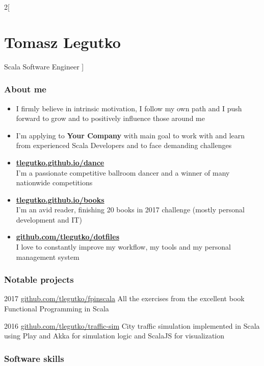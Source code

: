 \documentclass{tccv}
\begin{document}
\begin{multicols}{2}[
\part{Tomasz Legutko}{Scala Software Engineer}
]
\section{About me}
\begin{itemize}[noitemsep,topsep=0pt]
\item I firmly believe in intrinsic motivation, I follow my own path and I push forward to grow and to positively influence those around me
\item I'm applying to {\bfseries Your Company} with main goal to work with and learn from experienced Scala Developers and to face demanding challenges
\item {\bfseries\href{https://tlegutko.github.io/dance}{tlegutko.github.io/dance}}\\
  I'm a passionate competitive ballroom dancer and a winner of many nationwide competitions
\item {\bfseries\href{https://tlegutko.github.io/books}{tlegutko.github.io/books}}\\
  I'm an avid reader, finishing 20 books in 2017 challenge (mostly personal development and IT)
\item {\bfseries\href{https://github.com/tlegutko/dotfiles}{github.com/tlegutko/dotfiles}}\\
  I love to constantly improve my workflow, my tools and my personal management system

\end{itemize}

\section{Notable projects}
\begin{yearlist}

\item{2017}
     {\href{https://github.com/tlegutko/fpinscala}{github.com/tlegutko/fpinscala}}
     {All the exercises from the excellent book Functional Programming in Scala}

\item{2016}
     {\href{https://github.com/tlegutko/traffic-sim}{github.com/tlegutko/traffic-sim}}
     {City traffic simulation implemented in Scala using Play and Akka for simulation logic and ScalaJS for visualization}

\end{yearlist}

\section{Software skills}


\end{multicols}
\end{document}
